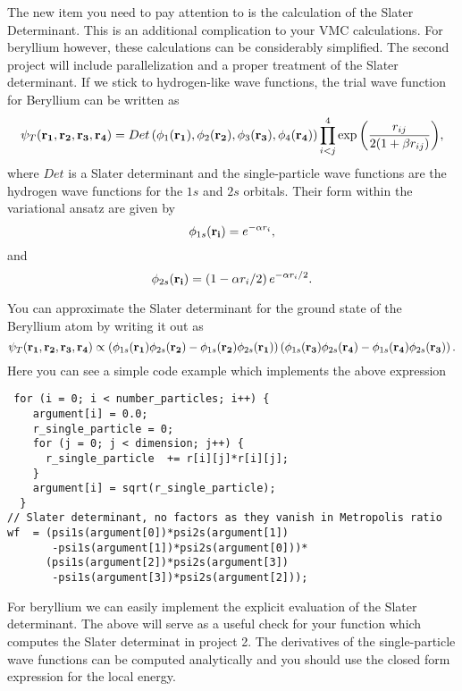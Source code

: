 \documentclass[10pt]{article}
\begin{document}
The new item you need to pay attention to is the calculation of the Slater Determinant. This is an additional complication
to your VMC calculations. For beryllium however, these calculations can be considerably simplified. The second project will
include parallelization and a proper treatment of the Slater determinant. 
If we stick to hydrogen-like wave functions,
the trial wave function for Beryllium can be written as 
\begin{equation}
   \psi_{T}({\bf r_1},{\bf r_2}, {\bf r_3}, {\bf r_4}) = 
   Det\left(\phi_{1}({\bf r_1}),\phi_{2}({\bf r_2}),
   \phi_{3}({\bf r_3}),\phi_{4}({\bf r_4})\right)
   \prod_{i<j}^{4}\exp{\left(\frac{r_{ij}}{2(1+\beta r_{ij})}\right)}, 
\end{equation}
where $Det$ is a Slater determinant and the single-particle wave functions
are the hydrogen wave functions for the $1s$ and $2s$ orbitals. Their form
within the variational ansatz are given by
\begin{equation}
\phi_{1s}({\bf r_i}) = e^{-\alpha r_i},
\end{equation}
and 
\begin{equation}
\phi_{2s}({\bf r_i}) = \left(1-\alpha r_i/2\right)e^{-\alpha r_i/2}.
\end{equation}

You can approximate the Slater determinant for the ground state of the Beryllium atom
by writing it out as
\begin{equation}
   \psi_{T}({\bf r_1},{\bf r_2}, {\bf r_3}, {\bf r_4}) \propto 
\left(\phi_{1s}({\bf r_1})\phi_{2s}({\bf r_2})-\phi_{1s}({\bf r_2})\phi_{2s}({\bf r_1})\right)
\left(\phi_{1s}({\bf r_3})\phi_{2s}({\bf r_4})-\phi_{1s}({\bf r_4})\phi_{2s}({\bf r_3})\right).
\end{equation}
Here you can see a simple code example which implements the above expression
\begin{lstlisting}
 for (i = 0; i < number_particles; i++) {
    argument[i] = 0.0;
    r_single_particle = 0;
    for (j = 0; j < dimension; j++) {
      r_single_particle  += r[i][j]*r[i][j];
    }
    argument[i] = sqrt(r_single_particle);
  }
// Slater determinant, no factors as they vanish in Metropolis ratio
wf  = (psi1s(argument[0])*psi2s(argument[1])
       -psi1s(argument[1])*psi2s(argument[0]))*
      (psi1s(argument[2])*psi2s(argument[3])
       -psi1s(argument[3])*psi2s(argument[2]));
\end{lstlisting}
For beryllium we can easily implement the explicit evaluation of the Slater determinant.  The above will serve as a useful check
for your function which computes the Slater determinat in project 2. 
The derivatives of the single-particle wave functions can be computed analytically and you should use the closed form expression for the local energy.
\end{document}
